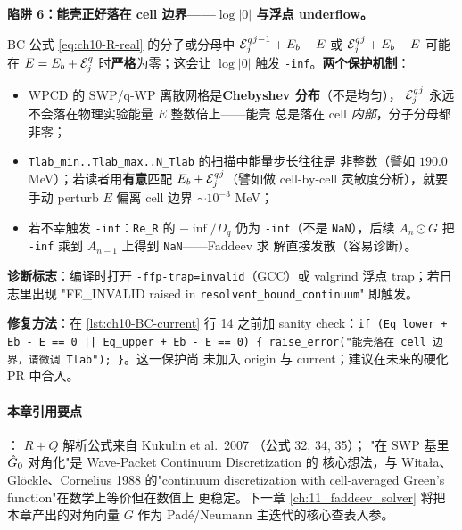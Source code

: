 \begin{pitfallbox}[label=box:ch10-pitfall-cell-edge-log]
\textbf{陷阱 6：能壳正好落在 cell 边界——\(\log|0|\) 与浮点 underflow。}

BC 公式 \cref{eq:ch10-R-real} 的分子或分母中
\({\mathcal{E}_{j}^{q}}^{j-1} + E_b - E\) 或 \({\mathcal{E}_{j}^{q}}^{j} + E_b - E\) 可能在
\(E = E_b + {\mathcal{E}_{j}^{q}}\) 时\textbf{严格}为零；这会让 \(\log|0|\) 触发
\texttt{-inf}。\textbf{两个保护机制}：

\begin{itemize}
  \item WPCD 的 SWP/q-WP 离散网格是\textbf{Chebyshev 分布}（不是均匀），
        \({\mathcal{E}_{j}^{q}}^{j}\) 永远不会落在物理实验能量 \(E\) 整数倍上——能壳
        总是落在 cell \emph{内部}，分子分母都非零；
  \item \texttt{Tlab\_min..Tlab\_max..N\_Tlab} 的扫描中能量步长往往是
        非整数（譬如 \(190.0\) MeV）；若读者用\textbf{有意}匹配
        \(E_b + {\mathcal{E}_{j}^{q}}^{j}\)（譬如做 cell-by-cell 灵敏度分析），就要
        手动 perturb \(E\) 偏离 cell 边界 \(\sim 10^{-3}\) MeV；
  \item 若不幸触发 \texttt{-inf}：\texttt{Re\_R} 的 \(-\inf/D_q\) 仍为
        \texttt{-inf}（不是 \texttt{NaN}），后续 \(A_n \odot G\)
        把 \texttt{-inf} 乘到 \(A_{n-1}\) 上得到 \texttt{NaN}——Faddeev 求
        解直接发散（容易诊断）。
\end{itemize}

\textbf{诊断标志}：编译时打开 \texttt{-ffp-trap=invalid}（GCC）或 valgrind
浮点 trap；若日志里出现 "FE\_INVALID raised in
\texttt{resolvent\_bound\_continuum}" 即触发。

\textbf{修复方法}：在 \cref{lst:ch10-BC-current} 行 14 之前加 sanity
check：\texttt{if (Eq\_lower + Eb - E == 0 || Eq\_upper + Eb - E == 0)
\{ raise\_error("能壳落在 cell 边界，请微调 Tlab"); \}}。这一保护尚
未加入 origin 与 current；建议在未来的硬化 PR 中合入。
\end{pitfallbox}

\paragraph{本章引用要点}：
\(R+Q\) 解析公式来自 Kukulin et al.~2007 \cite{Kukulin2007}（公式 32, 34, 35）；
"在 SWP 基里 \(\hat{G}_0\) 对角化"是 Wave-Packet Continuum Discretization 的
核心想法，与 Witała、Glöckle、Cornelius 1988 \cite{Witala1988} 的"continuum
discretization with cell-averaged Green's function"在数学上等价但在数值上
更稳定。下一章 \cref{ch:11_faddeev_solver} 将把本章产出的对角向量 \(G\)
作为 Padé/Neumann 主迭代的核心查表入参。
